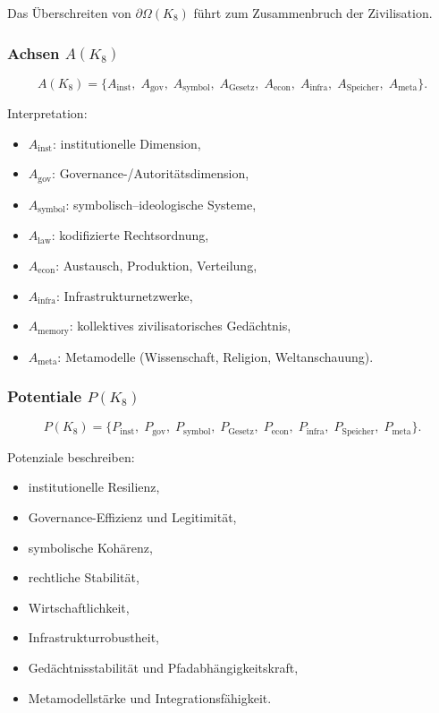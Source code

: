 Das Überschreiten von $\partial\Omega(K_8)$ führt zum Zusammenbruch der Zivilisation.

\subsubsection{Achsen \texorpdfstring{$A(K_8)$}{A(K_8)}}

\[
A(K_8)=
\{
A_{\mathrm{inst}},\;
A_{\mathrm{gov}},\;
A_{\mathrm{symbol}},\;
A_{\mathrm{Gesetz}},\;
A_{\mathrm{econ}},\;
A_{\mathrm{infra}},\;
A_{\mathrm{Speicher}},\;
A_{\mathrm{meta}}
\}.
\]

Interpretation:
\begin{itemize}
    \item $A_{\mathrm{inst}}$: institutionelle Dimension,
    \item $A_{\mathrm{gov}}$: Governance-/Autoritätsdimension,
    \item $A_{\mathrm{symbol}}$: symbolisch–ideologische Systeme,
    \item $A_{\mathrm{law}}$: kodifizierte Rechtsordnung,
    \item $A_{\mathrm{econ}}$: Austausch, Produktion, Verteilung,
    \item $A_{\mathrm{infra}}$: Infrastrukturnetzwerke,
    \item $A_{\mathrm{memory}}$: kollektives zivilisatorisches Gedächtnis,
    \item $A_{\mathrm{meta}}$: Metamodelle (Wissenschaft, Religion, Weltanschauung).
\end{itemize}

\subsubsection{Potentiale \texorpdfstring{$P(K_8)$}{P(K_8)}}

\[
P(K_8)=
\{
P_{\mathrm{inst}},\;
P_{\mathrm{gov}},\;
P_{\mathrm{symbol}},\;
P_{\mathrm{Gesetz}},\;
P_{\mathrm{econ}},\;
P_{\mathrm{infra}},\;
P_{\mathrm{Speicher}},\;
P_{\mathrm{meta}}
\}.
\]

Potenziale beschreiben:
\begin{itemize}
    \item institutionelle Resilienz,
    \item Governance-Effizienz und Legitimität,
    \item symbolische Kohärenz,
    \item rechtliche Stabilität,
    \item Wirtschaftlichkeit,
    \item Infrastrukturrobustheit,
    \item Gedächtnisstabilität und Pfadabhängigkeitskraft,
    \item Metamodellstärke und Integrationsfähigkeit.
\end{itemize}

